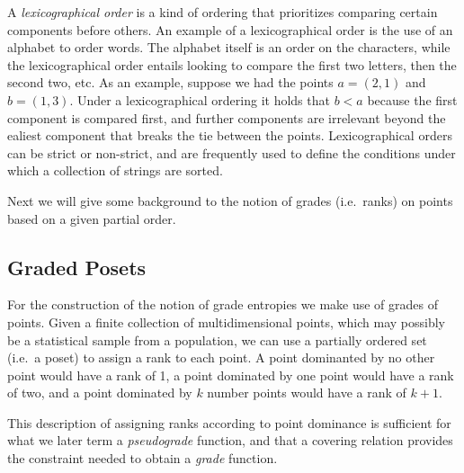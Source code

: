 \documentclass[
  letterpaper,
  DIV=11,
  numbers=noendperiod]{scrreprt}
\begin{document}
A \emph{lexicographical order} is a kind of ordering that prioritizes
comparing certain components before others. An example of a
lexicographical order is the use of an alphabet to order words. The
alphabet itself is an order on the characters, while the lexicographical
order entails looking to compare the first two letters, then the second
two, etc. As an example, suppose we had the points \(a = (2,1)\) and
\(b=(1,3)\). Under a lexicographical ordering it holds that \(b < a\)
because the first component is compared first, and further components
are irrelevant beyond the ealiest component that breaks the tie between
the points. Lexicographical orders can be strict or non-strict, and are
frequently used to define the conditions under which a collection of
strings are sorted.

Next we will give some background to the notion of grades (i.e.~ranks)
on points based on a given partial order.

\subsection{Graded Posets}\label{graded-posets}

For the construction of the notion of grade entropies we make use of
grades of points. Given a finite collection of multidimensional points,
which may possibly be a statistical sample from a population, we can use
a partially ordered set (i.e.~a poset) to assign a rank to each point. A
point dominanted by no other point would have a rank of 1, a point
dominated by one point would have a rank of two, and a point dominated
by \(k\) number points would have a rank of \(k+1\).

\begin{tcolorbox}[enhanced jigsaw, colframe=quarto-callout-note-color-frame, toptitle=1mm, bottomtitle=1mm, breakable, colbacktitle=quarto-callout-note-color!10!white, arc=.35mm, coltitle=black, opacitybacktitle=0.6, opacityback=0, leftrule=.75mm, titlerule=0mm, title=\textcolor{quarto-callout-note-color}{\faInfo}\hspace{0.5em}{Note}, rightrule=.15mm, toprule=.15mm, colback=white, bottomrule=.15mm, left=2mm]

This description of assigning ranks according to point dominance is
sufficient for what we later term a \emph{pseudograde} function, and
that a covering relation provides the constraint needed to obtain a
\emph{grade} function.

\end{tcolorbox}
\end{document}
